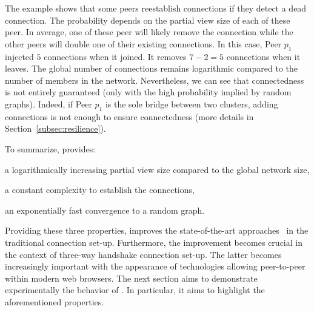 The example shows that some peers reestablish connections if they
detect a dead connection. The probability depends on the partial view
size of each of these peer. In average, one of these peer will likely
remove the connection while the other peers will double one of their
existing connections. In this case, Peer $p_1$ injected $5$
connections when it joined. It removes $7-2 =5 $ connections when it
leaves. The global number of connections remains logarithmic compared
to the number of members in the network. Nevertheless, we can see that
connectedness is not entirely guaranteed (only with the high
probability implied by random graphs). Indeed, if Peer $p_1$ is the
sole bridge between two clusters, adding connections is not enough to
ensure connectedness (more details in
Section~\ref{subsec:resilience}).


To summarize, \SPRAY provides:
\begin{inparaenum}[(i)]
\item a logarithmically increasing partial view size compared to the global
  network size,
\item a constant complexity to establish the connections,
\item an exponentially fast convergence to a random graph.
\end{inparaenum}
Providing these three properties, \SPRAY improves the state-of-the-art
approaches~\cite{ganesh2001scamp,voulgaris2005cyclon} in the traditional
connection set-up. Furthermore, the improvement becomes crucial in the context
of three-way handshake connection set-up.  The latter becomes increasingly
important with the appearance of technologies allowing peer-to-peer within
modern web browsers.  The next section aims to demonstrate experimentally the
behavior of \SPRAY. In particular, it aims to highlight the aforementioned
properties.


